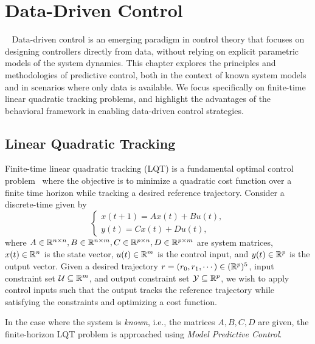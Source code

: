 \chapter{Data-Driven Control}~\label{ch:DDC}
Data-driven control is an emerging paradigm in control theory that focuses on designing controllers directly from data, without relying on explicit parametric models of the system dynamics. This chapter explores the principles and methodologies of predictive control, both in the context of known system models and in scenarios where only data is available. We focus specifically on finite-time linear quadratic tracking problems, and highlight the advantages of the behavioral framework in enabling data-driven control strategies.

\section{Linear Quadratic Tracking}
Finite-time linear quadratic tracking (LQT) is a fundamental optimal control problem~\cite{anderson2007} where the objective is to minimize a quadratic cost function over a finite time horizon while tracking a desired reference trajectory. Consider a discrete-time  given by 
\begin{equation}
    \begin{cases}
        x(t+1) = A x(t) + B u(t), \\
        y(t) = C x(t) + D u(t),
    \end{cases}
\end{equation}
where $A \in \mathbb{R}^{n \times n}, B \in \mathbb{R}^{n \times m}, C \in \mathbb{R}^{p \times n}, D \in \mathbb{R}^{p \times m}$ are system matrices, $x(t) \in \mathbb{R}^n$ is the state vector, $u(t) \in \mathbb{R}^m$ is the control input, and $y(t) \in \mathbb{R}^p$ is the output vector. Given a desired trajectory $r = (r_0, r_1, \cdots) \in (\mathbb{R}^p)^5$, input constraint set $\mathcal{U} \subseteq \mathbb{R}^m$, and output constraint set $\mathcal{Y} \subseteq \mathbb{R}^p$, we wish to apply control inputs such that the output tracks the reference trajectory while satisfying the constraints and optimizing a cost function.

In the case where the system is \emph{known}, i.e., the matrices $A, B, C, D$ are given, the finite-horizon LQT problem is approached using \emph{Model Predictive Control}.

